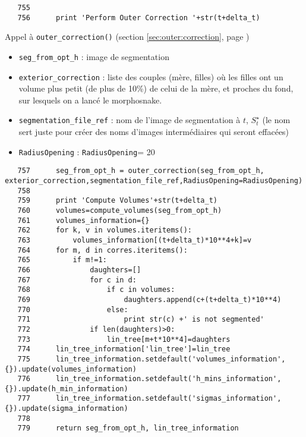 \documentclass{article}
\def \mycolor {red}
\begin{document}
\color{black}
\begin{verbatim}
   755	
   756	    print 'Perform Outer Correction '+str(t+delta_t)
\end{verbatim}
\color{\mycolor}
Appel \`a \texttt{outer\_correction()}
(section \ref{sec:outer:correction}, page \pageref{sec:outer:correction})
\begin{itemize}
\itemsep -1ex
\item \verb|seg_from_opt_h| : image de segmentation
\item \verb|exterior_correction| : liste des couples (m\`ere, filles) o\`u les filles ont un volume plus petit (de plus de 10\%) de celui de la m\`ere, et proches du fond, sur lesquels on a lanc\'e le morphosnake.
\item \verb|segmentation_file_ref| : nom de l'image de segmentation \`a $t$, $S^{\star}_t$ (le nom sert juste pour cr\'eer des noms d'images interm\'ediaires qui seront effac\'ees)
\item \verb|RadiusOpening| : \verb|RadiusOpening|= 20
\end{itemize}
\color{black}
\begin{verbatim}
   757	    seg_from_opt_h = outer_correction(seg_from_opt_h, exterior_correction,segmentation_file_ref,RadiusOpening=RadiusOpening)
   758	
   759	    print 'Compute Volumes'+str(t+delta_t)
   760	    volumes=compute_volumes(seg_from_opt_h)
   761	    volumes_information={}
   762	    for k, v in volumes.iteritems():
   763	        volumes_information[(t+delta_t)*10**4+k]=v
   764	    for m, d in corres.iteritems():
   765	        if m!=1:
   766	            daughters=[]
   767	            for c in d:
   768	                if c in volumes:
   769	                    daughters.append(c+(t+delta_t)*10**4)
   770	                else:
   771	                    print str(c) +' is not segmented'
   772	            if len(daughters)>0:
   773	                lin_tree[m+t*10**4]=daughters
   774	    lin_tree_information['lin_tree']=lin_tree
   775	    lin_tree_information.setdefault('volumes_information', {}).update(volumes_information)
   776	    lin_tree_information.setdefault('h_mins_information', {}).update(h_min_information)
   777	    lin_tree_information.setdefault('sigmas_information', {}).update(sigma_information)
   778	
   779	    return seg_from_opt_h, lin_tree_information
\end{verbatim}
\end{document}
